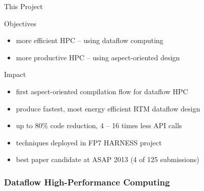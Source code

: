 \begin{frame}{This Project}
  \begin{beamerboxesrounded}{Objectives}
    \begin{itemize}
    \item more efficient HPC -- using dataflow computing
    \item more productive HPC -- using aspect-oriented design
    \end{itemize}
  \end{beamerboxesrounded}
  \vspace{0.3cm}
  \begin{beamerboxesrounded}{Impact}
    \begin{itemize}
    \item first aspect-oriented compilation flow for dataflow HPC
    \item produce fastest, most energy efficient RTM dataflow design
    \item up to 80\% code reduction, 4 -- 16 times less API calls
    \item techniques deployed in FP7 HARNESS project
    \item best paper candidate at ASAP 2013 (4 of 125 submissions)
    \end{itemize}
  \end{beamerboxesrounded}
\end{frame}

\begin{frame}
  \frametitle{Dataflow High-Performance Computing}
  \begin{figure}[!ht]
    \centering
    \def\svgwidth{0.9\linewidth}
    
  \end{figure}
\end{frame}

